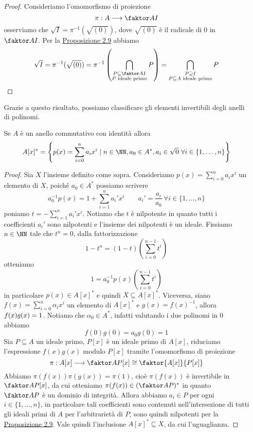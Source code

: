 \documentclass[11pt]{scrartcl}
\begin{document}
\begin{proof}
    Consideriamo l'omomorfismo di proiezione
    \[
        \pi: A\longrightarrow \faktor A I
    \]
    osserviamo che $\sqrt{I} = \pi^{-1}(\sqrt{(0)})$, dove $\sqrt{(0)}$ è il radicale di 
    $0$ in $\faktor A I$. Per la \hyperref[prop2.9]{Proposizione 2.9}
    abbiamo
    \[
        \sqrt{I} = \pi^{-1}(\sqrt{(0)}) = \pi^{-1}\left(\bigcap_{\substack{
            P\subseteq \faktor A I\\ P \text{ ideale primo}}} P\right) = 
            \bigcap_{\substack{P\supseteq I\\P \subseteq A\text{ ideale primo}}}P
    \]
\end{proof}

Grazie a questo risultato, possiamo classificare gli elementi invertibili 
degli anelli di polinomi.

\begin{proposition}
    Se $A$ è un anello commutativo con identità allora 
    \[
        A[x]^* = \left\{p(x) = \sum_{i = 0}^n a_ix^i\mid n \in \NN,
        a_0 \in A^*, a_i \in \sqrt{0}~\forall i \in \{1, \ldots, n\}\right\}
    \]
\end{proposition}

\begin{proof}
    Sia $X$ l'insieme definito come sopra. Consideriamo 
    $p(x) = \displaystyle\sum_{i = 0}^n a_i x^i$ un elemento di $X$, poiché
    $a_0 \in A^*$ possiamo scrivere 
    \[
        a_0^{-1}p(x) = 1 + \sum_{i = 1}^n a_i'x^i \qquad 
        a_i' = \frac{a_i}{a_0}~\forall i \in \{1, \ldots,n\}
    \]
    poniamo $t = \displaystyle -\sum_{i = 1}^n a_i'x^i$. Notiamo che $t$ è
    nilpotente in quanto tutti i coefficienti $a_i'$ sono nilpotenti e l'insieme
    dei nilpotenti è un ideale. Fissiamo $n \in \NN$ tale che $t^n = 0$, 
    dalla fattorizzazione 
    \[
        1 - t^n = (1 - t)\left(\sum_{i = 0}^{n - 1}t^i\right)
    \]
    otteniamo 
    \[
        1 = a_0^{-1}p(x)\left(\sum_{i = 0}^{n - 1}t^i\right)
    \]
    in particolare $p(x) \in A[x]^*$ e quindi $X \subseteq A[x]^*$.\newline
    Viceversa, siano $f(x) = \displaystyle\sum_{i = 0}^n\alpha_ix^i$ un 
    elemento di $A[x]^*$ e $g(x) = f(x)^{-1}$, allora $f(x)g(x) = \nolinebreak 1$.
    Notiamo che $\alpha_0 \in A^*$, infatti valutando i due polinomi in 0
    abbiamo
    \[
        f(0)g(0) = a_0g(0) = 1
    \]
    Sia $P \subseteq A$ un ideale primo, $P[x]$ è un ideale primo di $A[x]$,
    riduciamo l'espressione $f(x)g(x)$ modulo $P[x]$ tramite l'omomorfismo 
    di proiezione
    \[
        \pi: A[x]\longrightarrow \faktor A P [x] \cong \faktor{A[x]}{P[x]}
    \]
    Abbiamo $\pi(f(x))\pi(g(x)) = \pi(1)$, cioè $\pi(f(x))$ è invertibile in 
    $\faktor A P [x]$, da cui otteniamo $\pi(f(x)) \in (\faktor A P)^*$ in quanto $\faktor A P$
    è un dominio di integrità. Allora abbiamo $a_i \in P$ per ogni $i \in \{1, \ldots, n\}$,
    in particolare tali coefficienti sono contenuti nell'intersezione di tutti
    gli ideali primi di $A$ per l'arbitrarietà di $P$, sono quindi nilpotenti
    per la \hyperref[prop2.9]{Proposizione 2.9}. Vale quindi l'inclusione 
    $A[x]^* \subseteq X$, da cui l'uguaglianza.
\end{proof}
\end{document}

